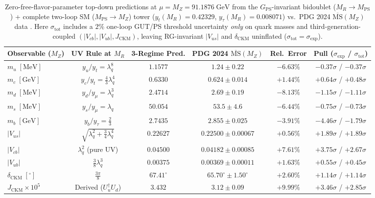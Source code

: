 \documentclass[11pt,a4paper]{article}
\begin{document}
\begin{table}[t!]
\centering
\caption{Zero-free-flavor-parameter top-down predictions at $\mu = M_Z = 91.1876\;\mathrm{GeV}$ from the $G_{\mathrm{PS}}$-invariant bidoublet ($M_R \to M_{\mathrm{PS}}$) + complete two-loop SM ($M_{\mathrm{PS}} \to M_Z$) tower ($y_t(M_R) = 0.42329$, $y_\tau(M_R) = 0.008071$) vs.\ PDG 2024 $\overline{\mathrm{MS}}(M_Z)$ data \cite{PDG2024,HuangZhou2021}. Here $\sigma_{\mathrm{tot}}$ includes a $2\%$ one-loop GUT/PS threshold uncertainty \emph{only} on quark masses and third-generation-coupled $(|V_{cb}|, |V_{ub}|, J_{\mathrm{CKM}})$, leaving RG-invariant $|V_{us}|$ and $\delta_{\mathrm{CKM}}$ uninflated ($\sigma_{\mathrm{tot}} = \sigma_{\mathrm{exp}}$).}
\label{tab:mz-predictions}
\vspace{0.35em}
\setlength{\tabcolsep}{4.5pt}
\footnotesize
\begin{tabular}{lccccc}
\toprule
Observable ($M_Z$) & UV Rule at $M_R$ & 3-Regime Pred. & PDG 2024 $\overline{\mathrm{MS}}(M_Z)$ & Rel.\ Error & Pull ($\sigma_{\mathrm{exp}}$ / $\sigma_{\mathrm{tot}}$) \\
\midrule
$m_u\;[\mathrm{MeV}]$ & $y_u/y_t = \lambda_q^8$ & $1.1577$ & $1.24 \pm 0.22$ & $-6.63\%$ & $-0.37\sigma$ / $-0.37\sigma$ \\
$m_c\;[\mathrm{GeV}]$ & $y_c/y_t = \frac{4}{3}\lambda_q^4$ & $0.6330$ & $0.624 \pm 0.014$ & $+1.44\%$ & $+0.64\sigma$ / $+0.48\sigma$ \\
$m_d\;[\mathrm{MeV}]$ & $y_d/y_\mu = \lambda_q^3$ & $2.4714$ & $2.69 \pm 0.19$ & $-8.13\%$ & $-1.15\sigma$ / $-1.11\sigma$ \\
$m_s\;[\mathrm{MeV}]$ & $y_s/y_\mu = \lambda_q$ & $50.054$ & $53.5 \pm 4.6$ & $-6.44\%$ & $-0.75\sigma$ / $-0.73\sigma$ \\
$m_b\;[\mathrm{GeV}]$ & $y_b/y_\tau = \frac{2}{3}$ & $2.7435$ & $2.855 \pm 0.025$ & $-3.91\%$ & $-4.46\sigma$ / $-1.79\sigma$ \\
\midrule
$|V_{us}|$ & $\sqrt{\lambda_q^2 + \frac{3}{4}\lambda_q^4}$ & $0.22627$ & $0.22500 \pm 0.00067$ & $+0.56\%$ & $+1.89\sigma$ / $+1.89\sigma$ \\
$|V_{cb}|$ & $\lambda_q^2$ (pure UV) & $0.04500$ & $0.04182 \pm 0.00085$ & $+7.61\%$ & $+3.75\sigma$ / $+2.67\sigma$ \\
$|V_{ub}|$ & $\frac{3}{8}\lambda_q^3$ & $0.00375$ & $0.00369 \pm 0.00011$ & $+1.63\%$ & $+0.55\sigma$ / $+0.45\sigma$ \\
$\delta_{\mathrm{CKM}}\;[^\circ]$ & $\frac{3\pi}{8}$ & $67.41^\circ$ & $65.70^\circ \pm 1.50^\circ$ & $+2.60\%$ & $+1.14\sigma$ / $+1.14\sigma$ \\
$J_{\mathrm{CKM}}\times 10^5$ & Derived ($U_u^\dagger U_d$) & $3.432$ & $3.12 \pm 0.09$ & $+9.99\%$ & $+3.46\sigma$ / $+2.85\sigma$ \\
\bottomrule
\end{tabular}
\end{table}
\end{document}
